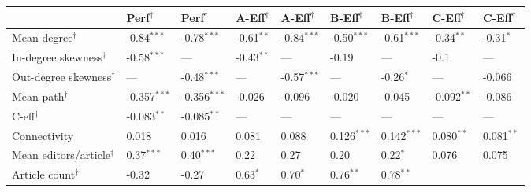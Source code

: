 \documentclass[10pt,twocolumn]{article}
\newcommand{\+}{\phantom{-}}
\begin{document}
\begin{table*}
\small
\begin{tabular}{lllllllll}
                               & Perf$^\dagger$ & Perf$^\dagger$ & A-Eff$^\dagger$ & A-Eff$^\dagger$ & B-Eff$^\dagger$ & B-Eff$^\dagger$ & C-Eff$^\dagger$ & C-Eff$^\dagger$ \\
\hline
Mean degree$^\dagger$          &  -0.84$^{***}$  &  -0.78$^{***}$
                               &  -0.61$^{**}$   &  -0.84$^{***}$
                               &  -0.50$^{***}$  &  -0.61$^{***}$
                               &  -0.34$^{**}$   &  -0.31$^{*}$ \\
In-degree skewness$^\dagger$   &  -0.58$^{***}$  & \+ ---      
                               &  -0.43$^{**}$   & \+ ---      
                               &  -0.19          & \+ ---      
                               &  -0.1           & \+ ---      \\
Out-degree skewness$^\dagger$  &  \+ ---         &  -0.48$^{***}$  
                               &  \+ ---         &  -0.57$^{***}$
                               &  \+ ---         &  -0.26$^{*}$
                               &  \+ ---         &  -0.066 \\
Mean path$^\dagger$            &  -0.357$^{***}$ &  -0.356$^{***}$ 
                               &  -0.026         &  -0.096
                               &  -0.020         &  -0.045
                               &  -0.092$^{**}$  &  -0.086 \\
C-eff$^\dagger$                &  -0.083$^{**}$  & -0.085$^{**}$  
                               &  \+ ---         & \+ ---      
                               &  \+ ---         & \+ ---      
                               &  \+ ---         & \+ --- \\
Connectivity                   & \+0.018         & \+0.016        
                               & \+0.081         & \+0.088
                               & \+0.126$^{***}$ & \+0.142$^{***}$
                               & \+0.080$^{**}$  & \+0.081$^{**}$ \\
Mean editors/article$^\dagger$ & \+0.37$^{***}$  & \+0.40$^{***}$ 
                               & \+0.22          & \+0.27
                               & \+0.20          & \+0.22$^{*}$
                               & \+0.076         & \+0.075 \\
Article count$^\dagger$        &  -0.32          & -0.27          
                               & \+0.63${^*}$    & \+0.70${^*}$ 
                               & \+0.76$^{**}$   & \+0.78$^{**}$

\end{tabular}
\end{table*}
\end{document}
